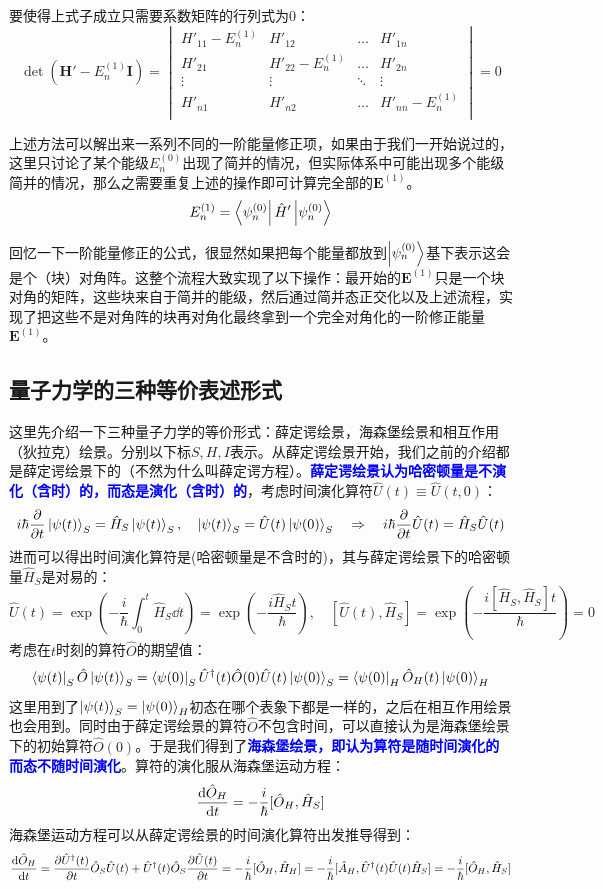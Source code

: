 要使得上式子成立只需要系数矩阵的行列式为0：
\[\det(\mathbf{H}'-E_n^{(1)}\mathbf{I})=\begin{vmatrix}
H'_{11}-E_n^{(1)} & H'_{12} & \ldots & H'_{1n}\\
H'_{21} & H'_{22}-E_n^{(1)} & \ldots & H'_{2n}\\
\vdots & \vdots & \ddots & \vdots\\
H'_{n1} & H'_{n2} & \ldots & H'_{nn}-E_n^{(1)}\\
\end{vmatrix}=0\]

上述方法可以解出来一系列不同的一阶能量修正项，如果由于我们一开始说过的，这里只讨论了某个能级$E_n^{(0)}$出现了简并的情况，但实际体系中可能出现多个能级简并的情况，那么之需要重复上述的操作即可计算完全部的$\mathbf{E}^{(1)}$。
\[E_n^{(1)}=\bra{\psi_n^{(0)}}\hat{H}'\ket{\psi_n^{(0)}}\]

回忆一下一阶能量修正的公式，很显然如果把每个能量都放到$\ket{\psi_{n}^{(0)}}$基下表示这会是个（块）对角阵。这整个流程大致实现了以下操作：最开始的$\mathbf{E}^{(1)}$只是一个块对角的矩阵，这些块来自于简并的能级，然后通过简并态正交化以及上述流程，实现了把这些不是对角阵的块再对角化最终拿到一个完全对角化的一阶修正能量$\mathbf{E}^{(1)}$。

\subsection{量子力学的三种等价表述形式}
这里先介绍一下三种量子力学的等价形式：薛定谔绘景，海森堡绘景和相互作用（狄拉克）绘景。分别以下标$S,H,I$表示。从薛定谔绘景开始，我们之前的介绍都是薛定谔绘景下的（不然为什么叫薛定谔方程）。\textcolor{blue}{\textbf{薛定谔绘景认为哈密顿量是不演化（含时）的，而态是演化（含时）的}}，考虑时间演化算符$\hat{U}(t)\equiv\hat{U}(t,0)$：
\[i\hbar\pdv{t}\ket{\psi(t)}_S=\hat{H}_S\ket{\psi(t)}_S, \quad \ket{\psi(t)}_S=\hat{U}(t)\ket{\psi(0)}_S \quad \Rightarrow \quad i\hbar\pdv{t}\hat{U}(t)=\hat{H}_S\hat{U}(t)\]
进而可以得出时间演化算符是(哈密顿量是不含时的)，其与薛定谔绘景下的哈密顿量$\hat{H}_S$是对易的：
\[\hat{U}(t)=\exp\left(-\frac{i}{\hbar}\int_{0}^{t}\hat{H}_S\dd{t}\right)=\exp\left(-\frac{i\hat{H}_St}{\hbar}\right), \quad [\hat{U}(t),\hat{H}_S]=\exp\left(-\frac{i[\hat{H}_S,\hat{H}_S]t}{\hbar}\right)=0\]
考虑在$t$时刻的算符$\hat{O}$的期望值：
\[\bra{\psi(t)}_S\hat{O}\ket{\psi(t)}_S=\bra{\psi(0)}_S\hat{U}^{\dagger}(t)\hat{O}(0)\hat{U}(t)\ket{\psi(0)}_S=\bra{\psi(0)}_H\hat{O}_H(t)\ket{\psi(0)}_H\]
这里用到了$\ket{\psi(t)}_S=\ket{\psi(0)}_H$初态在哪个表象下都是一样的，之后在相互作用绘景也会用到。同时由于薛定谔绘景的算符$\hat{O}$不包含时间，可以直接认为是海森堡绘景下的初始算符$\hat{O}(0)$。于是我们得到了\textcolor{blue}{\textbf{海森堡绘景，即认为算符是随时间演化的而态不随时间演化}}。算符的演化服从海森堡运动方程：
\[\dv{\hat{O}_H}{t}=-\frac{i}{\hbar}[\hat{O}_H,\hat{H}_S]\]
海森堡运动方程可以从薛定谔绘景的时间演化算符出发推导得到：
\[\dv{\hat{O}_H}{t}=\frac{\partial\hat{U}^{\dagger}(t)}{\partial t}\hat{O}_S\hat{U}(t)+\hat{U}^{\dagger}(t)\hat{O}_S\frac{\partial\hat{U}(t)}{\partial t}=-\frac{i}{\hbar}[\hat{O}_H,\hat{H}_H]=-\frac{i}{\hbar}[\hat{A}_H,\hat{U}^\dagger(t)\hat{U}(t)\hat{H}_S]=-\frac{i}{\hbar}[\hat{O}_H,\hat{H}_S]\]

